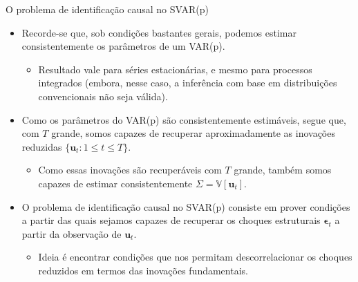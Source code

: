 \documentclass[11pt]{beamer}
\begin{document}
\begin{frame}{O problema de identificação causal no SVAR(p)}
\begin{itemize}
	\item Recorde-se que, sob condições bastantes gerais, podemos estimar consistentemente os parâmetros de um VAR(p).
	\begin{itemize}
		\item Resultado vale para séries estacionárias, e mesmo para processos integrados (embora, nesse caso, a inferência com base em distribuições convencionais não seja válida).
	\end{itemize}
	\item Como os parâmetros do VAR(p) são consistentemente estimáveis, segue que, com $T$ grande, somos capazes de recuperar aproximadamente as {\color{blue}inovações reduzidas} $\{\boldsymbol{u}_t : 1 \leq t \leq T\}$. 
	\begin{itemize}
		\item Como essas inovações são recuperáveis com $T$ grande, também somos capazes de estimar consistentemente $\Sigma = \mathbb{V}[\boldsymbol{u}_t]$.
	\end{itemize}
	\item O {\color{blue}problema de identificação causal no SVAR(p)} consiste em prover condições a partir das quais sejamos capazes de {\color{blue}recuperar os choques estruturais $\boldsymbol{\epsilon}_t$ a partir da observação de $\boldsymbol{u}_t$}.
	\begin{itemize}
		\item Ideia é encontrar condições que nos permitam descorrelacionar os choques reduzidos em termos das inovações fundamentais.
	\end{itemize}
\end{itemize}
\end{frame}
\end{document}
